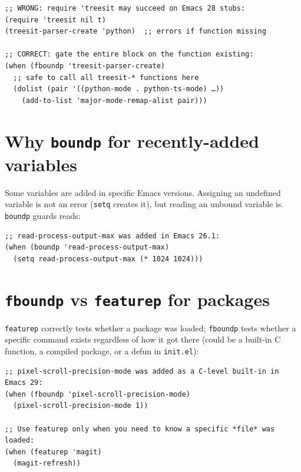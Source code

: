 \begin{verbatim}
;; WRONG: require 'treesit may succeed on Emacs 28 stubs:
(require 'treesit nil t)
(treesit-parser-create 'python)  ;; errors if function missing

;; CORRECT: gate the entire block on the function existing:
(when (fboundp 'treesit-parser-create)
  ;; safe to call all treesit-* functions here
  (dolist (pair '((python-mode . python-ts-mode) …))
    (add-to-list 'major-mode-remap-alist pair)))
\end{verbatim}

\section{Why \texttt{boundp} for recently-added variables}\label{why-boundp-for-recently-added-variables}

Some variables are added in specific Emacs versions. Assigning an undefined variable is not an error (\texttt{setq} creates it), but reading an unbound variable is. \texttt{boundp} guards reads:

\begin{verbatim}
;; read-process-output-max was added in Emacs 26.1:
(when (boundp 'read-process-output-max)
  (setq read-process-output-max (* 1024 1024)))
\end{verbatim}

\section{\texttt{fboundp} vs \texttt{featurep} for packages}\label{fboundp-vs-featurep-for-packages}

\texttt{featurep} correctly tests whether a package was loaded; \texttt{fboundp} tests whether a specific command exists regardless of how it got there (could be a built-in C function, a compiled package, or a defun in \texttt{init.el}):

\begin{verbatim}
;; pixel-scroll-precision-mode was added as a C-level built-in in Emacs 29:
(when (fboundp 'pixel-scroll-precision-mode)
  (pixel-scroll-precision-mode 1))

;; Use featurep only when you need to know a specific *file* was loaded:
(when (featurep 'magit)
  (magit-refresh))
\end{verbatim}

